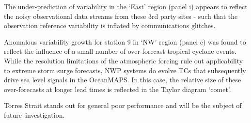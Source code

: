 The under-prediction of variability in the `East' region (panel i) appears to reflect the noisy observational data streams from these 3rd party sites - such that the observation reference variability is inflated by communications glitches.

Anomalous variability growth for station 9 in `NW' region (panel c) was found to reflect the influence of a small number of over-forecast tropical cyclone events.  While the resolution limitations of the atmospheric forcing rule out applicability to extreme storm surge forecasts, NWP systems do evolve TCs that subsequently drive sea level signals in the OceanMAPS. In this case, the relative size of these over-forecasts at longer lead times is reflected in the Taylor diagram `comet'.

Torres Strait stands out for general poor performance and will be the subject of future~investigation.



